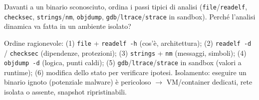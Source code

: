 \question[5]
Davanti a un binario sconosciuto, ordina i passi tipici di analisi
(\lstinline|file|/\lstinline|readelf|, \lstinline|checksec|, \lstinline|strings|/\lstinline|nm|, \lstinline|objdump|, \lstinline|gdb|/\lstinline|ltrace|/\lstinline|strace| in sandbox).
Perché l'analisi dinamica va fatta in un ambiente isolato?
\begin{solution}
Ordine ragionevole: (1) \lstinline|file| + \lstinline|readelf -h| (cos'è, architettura); (2) \lstinline|readelf -d| / \lstinline|checksec| (dipendenze, protezioni); (3) \lstinline|strings| + \lstinline|nm| (messaggi, simboli); (4) \lstinline|objdump -d| (logica, punti caldi); (5) \lstinline|gdb|/\lstinline|ltrace|/\lstinline|strace| in sandbox (valori a runtime); (6) modifica dello stato per verificare ipotesi.
Isolamento: eseguire un binario ignoto (potenziale malware) è pericoloso $\to$ VM/container dedicati, rete isolata o assente, snapshot ripristinabili.
\end{solution}
